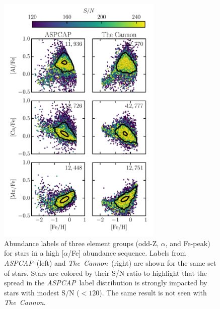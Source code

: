 \documentclass[12pt,preprint]{aastex6}
\newcommand{\project}[1]{\textsl{#1}}
\newcommand{\TheCannon}{\project{The~Cannon}}
\newcommand{\acronym}[1]{{\small{#1}}}
\newcommand{\aspcap}{\project{\acronym{ASPCAP}}}
\begin{document}
\begin{figure}[p]
\centering
\includegraphics[width=0.7\textwidth]{high-alpha-sequence.pdf}
\caption{Abundance labels of three element groups (odd-Z, $\alpha$, and Fe-peak) for stars in a high [$\alpha$/Fe] abundance sequence. Labels from \aspcap\ (left) and \TheCannon\ (right) are shown for the same set of stars. Stars are colored by their S/N ratio to highlight that the spread in the \aspcap\ label distribution is strongly impacted by stars with modest S/N ($<120$). The same result is not seen with \TheCannon.\label{fig:high-alpha-sequence}}
\end{figure}

\clearpage
\end{document}

